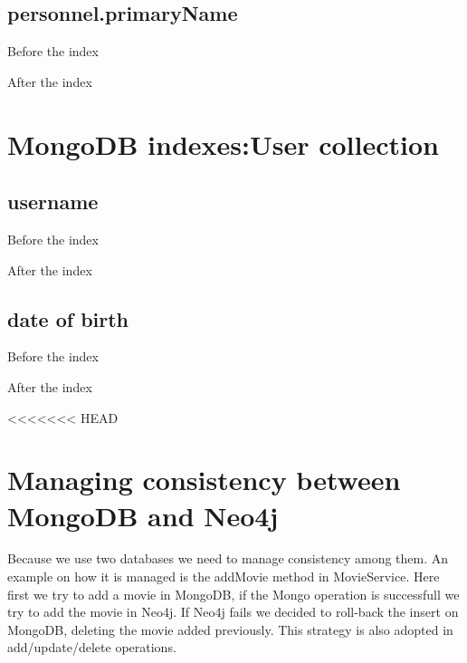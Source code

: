 \begin{alphasection}
\subsection{personnel.primaryName}
Before the index

After the index

\section{MongoDB indexes:User collection}
\subsection{username}
Before the index

After the index

\subsection{date of birth}
Before the index

After the index

<<<<<<< HEAD
\section{Managing consistency between MongoDB and Neo4j}
Because we use two databases we need to manage consistency among them. An example on how it is managed is the addMovie method in MovieService. Here first we try to add a movie in MongoDB, if the Mongo operation is successfull we try to add the movie in Neo4j. If Neo4j fails we decided to roll-back the insert on MongoDB, deleting the movie added previously. This strategy is also adopted in add/update/delete operations.

\end{alphasection}
